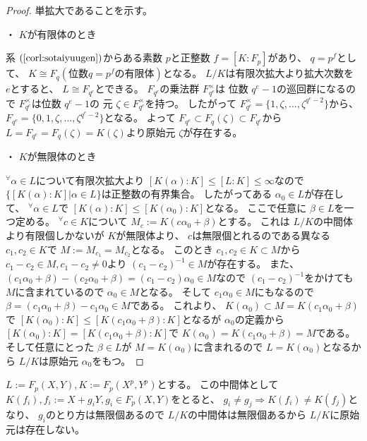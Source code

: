 \documentclass[../master_galois_theory]{subfiles}
\begin{document}
\begin{proof}
  単拡大であることを示す。

  ・ $K$が有限体のとき

  系 $(\mathrm{\ref{corl:sotaiyuugen}})$からある素数 $p$と正整数 $f = [K:F_p]$があり、 $q = p^f$として、
  $K \cong F_q (位数 q = p^f の有限体)$となる。
  $L/K$は有限次拡大より拡大次数を $e$とすると、
  $L \cong F_{q^e}$とできる。
  $F_{q^e}$の乗法群 $F_{q^e}^\times$は
  位数 $q^e - 1$の巡回群になるので $F_{q^e}^\times$は位数 $q^e-1$の
  元 $\zeta \in F_{q^e}^\times$を持つ。
  したがって $F_{q^e}^\times = \{ 1 , \zeta , \dots , \zeta^{q^e-2} \}$から、
  $F_{q^e} = \{ 0 , 1 , \zeta , \dots , \zeta^{q^e-2} \}$となる。
  よって $F_{q^e} \subset F_q(\zeta) \subset F_{q^e}$から
  $L = F_{q^e} = F_q(\zeta) = K(\zeta)$より原始元 $\zeta$が存在する。

  ・ $K$が無限体のとき

  ${}^\forall \alpha \in L$について有限次拡大より
  $[K(\alpha):K] \leq [L:K] \leq \infty$なので
  $\{ [K(\alpha):K] | \alpha \in L \}$は正整数の有界集合。
  したがってある $\alpha_0 \in L$が存在して、
  ${}^\forall \alpha \in L$で $[K(\alpha):K] \leq [K(\alpha_0):K]$となる。
  ここで任意に $\beta \in L$を一つ定める。
  ${}^\forall c \in K$について $M_c := K(c \alpha_0 + \beta)$とする。
  これは $L/K$の中間体より有限個しかないが $K$が無限体より、 $c$は無限個とれるのである異なる $c_1 , c_2 \in K$で
  $M := M_{c_1} = M_{c_2}$となる。
  このとき $c_1 , c_2 \in K \subset M$から $c_1 - c_2 \in M , c_1 - c_2 \neq 0$より $(c_1 - c_2)^{-1} \in M$が存在する。
  また、 $(c_1 \alpha_0 + \beta) - (c_2 \alpha_0 + \beta) = (c_1 - c_2) \alpha_0 \in M$なので $(c_1 - c_2)^{-1}$をかけても $M$に含まれているので
  $\alpha_0 \in M$となる。
  そして $c_1 \alpha_0 \in M$にもなるので
  $\beta = (c_1 \alpha_0 + \beta) - c_1 \alpha_0 \in M$である。
  これより、 $K(\alpha_0) \subset M = K(c_1 \alpha_0 + \beta)$で
  $[K(\alpha_0):K] \leq [K(c_1 \alpha_0 + \beta):K]$となるが
  $\alpha_0$の定義から $[K(\alpha_0):K] = [K(c_1 \alpha_0 + \beta):K]$で
  $K(\alpha_0) = K(c_1 \alpha_0 + \beta) = M$である。
  そして任意にとった $\beta \in L$が $M = K(\alpha_0)$に含まれるので
  $L = K(\alpha_0)$となるから $L/K$は原始元 $\alpha_0$をもつ。
\end{proof}

\begin{exam}
  $L := F_p(X,Y) , K := F_p(X^p , Y^p)$とする。
  この中間体として $K(f_i) , f_i := X + g_i Y , g_i \in F_p(X,Y)$をとると、
  $g_i \neq g_j \Rightarrow K(f_i) \neq K(f_j)$となり、
  $g_i$のとり方は無限個あるので $L/K$の中間体は無限個あるから
  $L/K$に原始元は存在しない。
\end{exam}
\end{document}
